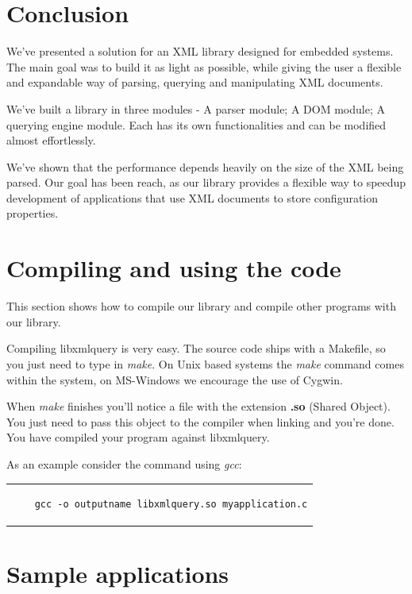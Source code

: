 \documentclass[a4paper]{report}
\begin{document}
\chapter{Conclusion} \label{chap:concl}
	We've presented a solution for an XML library designed for embedded systems. The main goal was to build it as light as possible, while giving the user a flexible and expandable way of parsing, querying and manipulating
	XML documents. 
	
	We've built a library in three modules - A parser module; A DOM module; A querying engine module. Each has its own functionalities and can be modified almost effortlessly.
	
	We've shown that the performance depends heavily on the size of the XML being parsed. Our goal has been reach, as our library provides a flexible way to speedup development of applications that use XML documents
	to store configuration properties.
	 

\appendix 
\chapter{Compiling and using the code}\label{chap:gcc}
	This section shows how to compile our library and compile other programs with our library.
	
	Compiling libxmlquery is very easy. The source code ships with a Makefile, so you just need to type in \emph{make}. On Unix based systems the \emph{make} command comes within the system, on MS-Windows we 
	encourage the use of Cygwin.
	
	When \emph{make} finishes you'll notice a file with the extension \textbf{.so} (Shared Object). You just need to pass this object to the compiler when linking and you're done. You have compiled your program against 
	libxmlquery.
	
	As an example consider the command using \emph{gcc}:
	
	\begin{center}
	\lstset{language=bash,caption=Compiling a program against our library, captionpos=b}
	\begin{tabular}{c}
	\begin{lstlisting}
	gcc -o outputname libxmlquery.so myapplication.c
	\end{lstlisting}
	\end{tabular}
	\end{center}
	
\chapter{Sample applications}\label{chap:app} %
\end{document}
